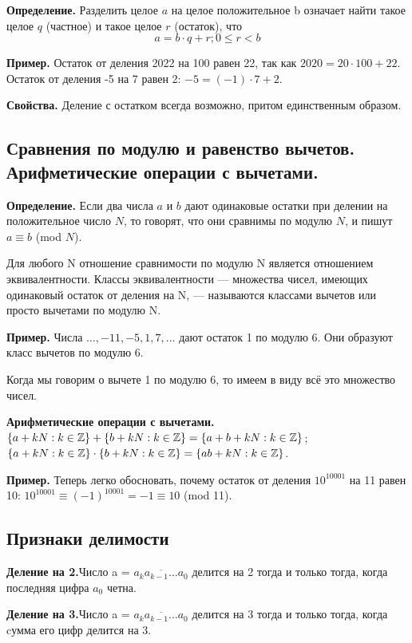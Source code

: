 \documentclass[a4paper, 10pt]{article}
\begin{document}
\textbf{Определение.} Разделить целое $a$ на целое положительное b означает найти такое целое $q$ (частное) и такое целое $r$ (остаток), что
$$a = b \cdot q + r; 0 \leqslant r < b$$

\textbf{Пример.} Остаток от деления 2022 на 100 равен 22, так как $2020 = 20 \cdot 100 + 22$. Остаток от деления -5 на 7 равен 2: $-5 = (-1) \cdot 7 + 2$.

\textbf{Свойства.} Деление с остатком всегда возможно, притом единственным
образом.

\subsection{Сравнения по модулю и равенство вычетов. Арифметические операции с вычетами.}

\textbf{Определение.} Если два числа $a$ и $b$ дают одинаковые остатки при делении на положительное число $N$, то говорят, что они сравнимы по модулю $N$, и пишут $a \equiv b$ (mod $N$).

Для любого N отношение сравнимости по модулю N является отношением эквивалентности. Классы эквивалентности — множества чисел, имеющих одинаковый остаток от деления на N, — называются классами вычетов или просто вычетами по модулю N.

\textbf{Пример.} Числа $\dots , -11, -5, 1, 7, \dots$ дают остаток 1 по модулю 6. Они образуют класс вычетов по модулю 6.

Когда мы говорим о вычете 1 по модулю 6, то имеем в виду всё это множество чисел.

\textbf{Арифметические операции с вычетами.} \\
$\{a+kN : k \in \mathbb{Z} \} + \{b + kN : k \in \mathbb{Z}\}= \{a + b + kN : k \in \mathbb{Z} \}$; \\
$\{ a + kN : k \in \mathbb{Z}\} \cdot \{b + kN : k \in \mathbb{Z}\} = \{ab+kN : k \in \mathbb{Z}\}$.

\textbf{Пример.} Теперь легко обосновать, почему остаток от деления $10^{10001}$ на 11 равен 10: $10^{10001} \equiv (-1)^{10001} = -1 \equiv 10$ (mod 11).

\subsection{Признаки делимости}

\textbf{Деление на 2.}Число a = $\overline{a_ka_{k-1}\dots a_0}$ делится на 2 тогда и только тогда, когда последняя цифра $a_0$ четна.

\textbf{Деление на 3.}Число a = $\overline{a_ka_{k-1}\dots a_0}$ делится на 3 тогда и только тогда, когда cумма его цифр делится на 3.
\end{document}
